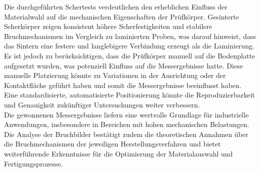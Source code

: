 Die durchgeführten Schertests verdeutlichen den erheblichen Einfluss der Materialwahl auf die mechanischen Eigenschaften der Prüfkörper. Gesinterte Scherkörper zeigen konsistent höhere Scherfestigkeiten und stabilere Bruchmechanismen im Vergleich zu laminierten Proben, was darauf hinweist, dass das Sintern eine festere und langlebigere Verbindung erzeugt als die Laminierung.\\
Es ist jedoch zu berücksichtigen, dass die Prüfkörper manuell auf die Bodenplatte aufgesetzt wurden, was potenziell Einfluss auf die Messergebnisse hatte. Diese manuelle Platzierung könnte zu Variationen in der Ausrichtung oder der Kontaktfläche geführt haben und somit die Messergebnisse beeinflusst haben. Eine standardisierte, automatisierte Positionierung könnte die Reproduzierbarkeit und Genauigkeit zukünftiger Untersuchungen weiter verbessern.\\
Die gewonnenen Messergebnisse liefern eine wertvolle Grundlage für industrielle Anwendungen, insbesondere in Bereichen mit hohen mechanischen Belastungen. Die Analyse der Bruchbilder bestätigt zudem die theoretischen Annahmen über die Bruchmechanismen der jeweiligen Herstellungsverfahren und bietet weiterführende Erkenntnisse für die Optimierung der Materialauswahl und Fertigungsprozesse.\\